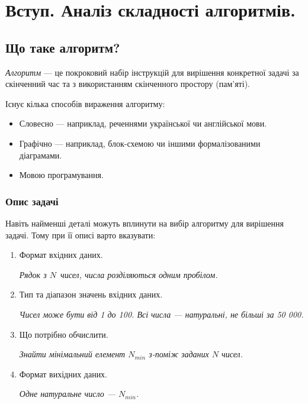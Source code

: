 \documentclass[12pt,a4paper]{report}
\begin{document}
\chapter{Вступ. Аналіз складності алгоритмів.}

\begingroup
\let\clearpage\relax
\tableofcontents
\endgroup



\section{Що таке алгоритм?}
\emph{Алгоритм} --- це покроковий набір інструкцій для вирішення конкретної задачі за скінченний час та з використанням скінченного простору (пам’яті).

\vspace{0.5em}
Існує кілька способів вираження алгоритму:
\begin{itemize}
    \item Словесно --- наприклад, реченнями української чи англійської мови.
    \item Графічно --- наприклад, блок-схемою чи іншими формалізованими діаграмами.
    \item Мовою програмування.
\end{itemize}


\begin{minipage}{\linewidth}
\subsection*{Опис задачі}
Навіть найменші деталі можуть вплинути на вибір алгоритму для вирішення задачі.
Тому при її описі варто вказувати:
\begin{enumerate}
    \item Формат вхідних даних.

        {\itshape Рядок з \(N\)\ чисел, числа розділяються одним пробілом.}

    \item Тип та діапазон значень вхідних даних.

        {\itshape Чисел може бути від 1 до 100. Всі числа --- натуральні, не більші за 50 000.}

    \item Що потрібно обчислити.

        {\itshape Знайти мінімальний елемент \(N_{min}\) з-поміж заданих \(N\) чисел.}

    \item Формат вихідних даних.

        {\itshape Одне натуральне число --- \(N_{min}\).}

\end{enumerate}
\end{minipage}
\end{document}
